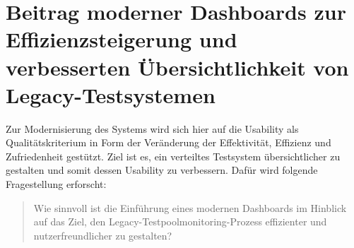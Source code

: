 \section{Beitrag moderner Dashboards zur Effizienzsteigerung und verbesserten Übersichtlichkeit von Legacy-Testsystemen}
\label{ch:Problem:meinProblem_Forschungsfragen}

Zur Modernisierung des Systems wird sich hier auf die Usability als Qualitätskriterium in Form der Veränderung der Effektivität, Effizienz und Zufriedenheit gestützt. Ziel ist es, ein verteiltes Testsystem übersichtlicher zu gestalten und somit dessen Usability zu verbessern.
Dafür wird folgende Fragestellung erforscht:



\begin{quote}
    Wie sinnvoll
    ist die Einführung eines modernen Dash\-boards
    im Hinblick auf das Ziel,
    den Legacy-Testpoolmonitoring-Prozess effizienter und nutzerfreundlicher zu gestalten?
\end{quote}

